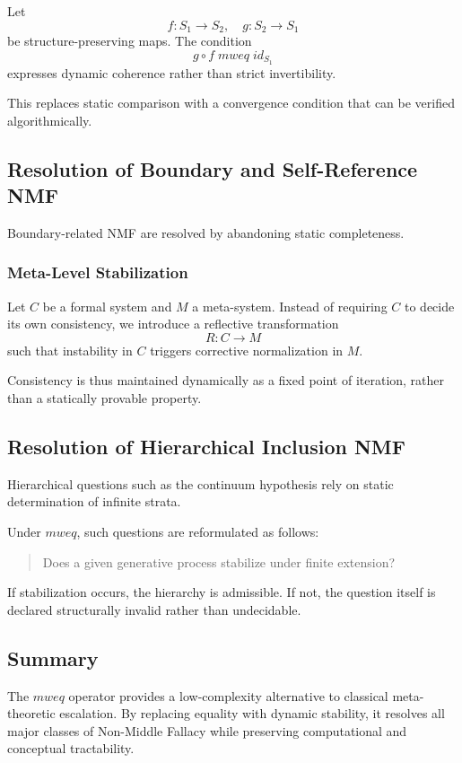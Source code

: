 \documentclass[11pt]{article}
\begin{document}
Let
\[
f : S_1 \rightarrow S_2, \quad g : S_2 \rightarrow S_1
\]
be structure-preserving maps.
The condition
\[
g \circ f \; mweq \; id_{S_1}
\]
expresses dynamic coherence rather than strict invertibility.

This replaces static comparison with a convergence condition that can
be verified algorithmically.

\subsection{Resolution of Boundary and Self-Reference NMF}

Boundary-related NMF are resolved by abandoning static completeness.

\subsubsection{Meta-Level Stabilization}

Let $C$ be a formal system and $M$ a meta-system.
Instead of requiring $C$ to decide its own consistency, we introduce
a reflective transformation
\[
R : C \rightarrow M
\]
such that instability in $C$ triggers corrective normalization in $M$.

Consistency is thus maintained dynamically as a fixed point of
iteration, rather than a statically provable property.

\subsection{Resolution of Hierarchical Inclusion NMF}

Hierarchical questions such as the continuum hypothesis rely on
static determination of infinite strata.

Under $mweq$, such questions are reformulated as follows:
\begin{quote}
Does a given generative process stabilize under finite extension?
\end{quote}

If stabilization occurs, the hierarchy is admissible.
If not, the question itself is declared structurally invalid rather
than undecidable.

\subsection{Summary}

The $mweq$ operator provides a low-complexity alternative to classical
meta-theoretic escalation.
By replacing equality with dynamic stability, it resolves all major
classes of Non-Middle Fallacy while preserving computational and
conceptual tractability.
\end{document}
